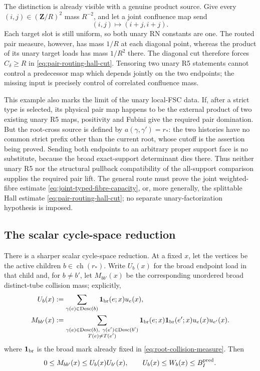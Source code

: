 \documentclass[11pt]{article}
\begin{document}
The distinction is already visible with a genuine product source.  Give every
\((i,j)\in(\mathbf Z/R)^2\) mass \(R^{-2}\), and let a joint confluence map
send
\[
 (i,j)\longmapsto(i+j,i+j).
\]
Each target slot is still uniform, so both unary RN constants are one.  The
routed pair measure, however, has mass \(1/R\) at each diagonal point, whereas
the product of its unary target loads has mass \(1/R^2\) there.  The diagonal
cut therefore forces \(C_\delta\ge R\) in
\eqref{eq:pair-routing-hall-cut}.  Tensoring two unary R5 statements cannot
control a predecessor map which depends jointly on the two endpoints; the
missing input is precisely control of correlated confluence mass.

This example also marks the limit of the unary local-FSC data.  If, after a
strict type is selected, its physical pair map happens to be the external
product of two existing unary R5 maps, positivity and Fubini give the required
pair domination.  But the root-cross source is defined by
\(a(\gamma,\gamma')=r_\ast\): the two histories have no common strict prefix
other than the current root, whose cutoff is the assertion being proved.
Sending both endpoints to an arbitrary proper support face is no substitute,
because the broad exact-support determinant dies there.  Thus neither unary
R5 nor the structural pullback compatibility of the all-support comparison
supplies the required pair lift.  The general route must prove the joint
weighted-fibre estimate \eqref{eq:joint-typed-fibre-capacity}, or, more
generally, the splittable Hall estimate \eqref{eq:pair-routing-hall-cut}; no separate
unary-factorization hypothesis is imposed.

\subsection{The scalar cycle-space reduction}

There is a sharper scalar cycle-space reduction.  At a fixed \(x\), let the vertices be the
active children \(b\in\operatorname{ch}(r_\ast)\).  Write \(U_b(x)\) for the
broad endpoint load in that child and, for \(b\ne b'\), let
\(M_{bb'}(x)\) be the corresponding unordered broad distinct-tube collision
mass; explicitly,
\[
 \begin{aligned}
 U_b(x)&:=\sum_{\gamma(e)\in\operatorname{Desc}(b)}
          {\bf1}_{\rm br}(e;x)u_e(x),\\
 M_{bb'}(x)&:=
 \sum_{\substack{\gamma(e)\in\operatorname{Desc}(b),\
                  \gamma(e')\in\operatorname{Desc}(b')\\
                  T(e)\ne T(e')}}
 {\bf1}_{\rm br}(e;x){\bf1}_{\rm br}(e';x)u_e(x)u_{e'}(x).
 \end{aligned}
\]
where \({\bf1}_{\rm br}\) is the broad mark already fixed in
\eqref{eq:root-collision-measure}.  Then
\begin{equation}\label{eq:broad-child-edge-majorant}
 0\le M_{bb'}(x)\le U_b(x)U_{b'}(x),
 \qquad
 U_b(x)\le W_b(x)\le B_I^{\rm pred}.
\end{equation}
\end{document}
